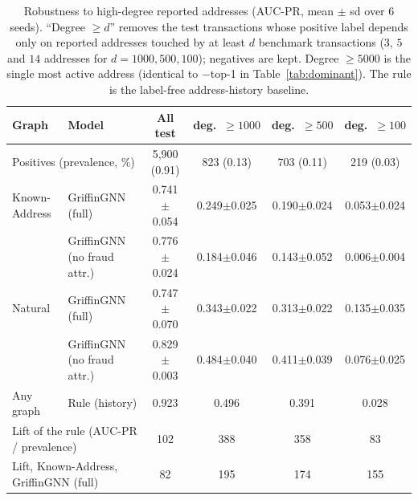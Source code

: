 \begin{table}[t]\centering\small
\caption{Robustness to high-degree reported addresses (AUC-PR, mean $\pm$ sd over 6 seeds). ``Degree $\geq d$'' removes the test transactions whose positive label depends only on reported addresses touched by at least $d$ benchmark transactions ($3$, $5$ and $14$ addresses for $d=1000,500,100$); negatives are kept. Degree $\geq5000$ is the single most active address (identical to $-$top-1 in Table~\ref{tab:dominant}). The rule is the label-free address-history baseline.}
\label{tab:service}
\begin{tabular}{llcccc}\toprule
Graph & Model & All test & deg.\ $\geq1000$ & deg.\ $\geq500$ & deg.\ $\geq100$ \\
\midrule
\multicolumn{2}{l}{Positives (prevalence, \%)} & 5,900 (0.91) & 823 (0.13) & 703 (0.11) & 219 (0.03) \\
\midrule
Known-Address & GriffinGNN (full) & 0.741$\pm$0.054 & 0.249$\pm$0.025 & 0.190$\pm$0.024 & 0.053$\pm$0.024 \\
 & GriffinGNN (no fraud attr.) & 0.776$\pm$0.024 & 0.184$\pm$0.046 & 0.143$\pm$0.052 & 0.006$\pm$0.004 \\
Natural & GriffinGNN (full) & 0.747$\pm$0.070 & 0.343$\pm$0.022 & 0.313$\pm$0.022 & 0.135$\pm$0.035 \\
 & GriffinGNN (no fraud attr.) & 0.829$\pm$0.003 & 0.484$\pm$0.040 & 0.411$\pm$0.039 & 0.076$\pm$0.025 \\
Any graph & Rule (history) & 0.923 & 0.496 & 0.391 & 0.028 \\
\midrule
\multicolumn{2}{l}{Lift of the rule (AUC-PR / prevalence)} & 102 & 388 & 358 & 83 \\
\multicolumn{2}{l}{Lift, Known-Address, GriffinGNN (full)} & 82 & 195 & 174 & 155 \\
\bottomrule\end{tabular}\end{table}
